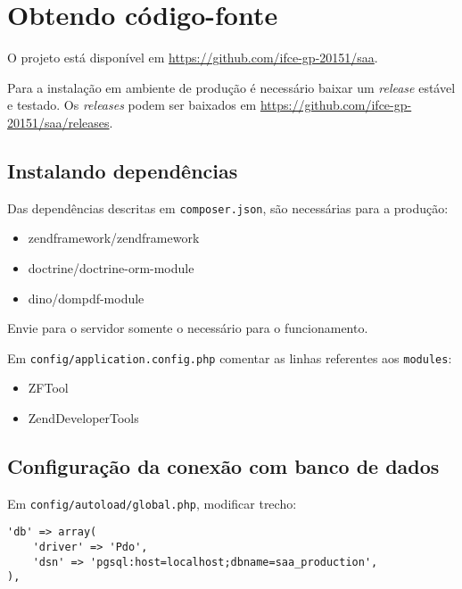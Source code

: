 \section{Obtendo código-fonte}\label{obtendo-cuxf3digo-fonte}

O projeto está disponível em \url{https://github.com/ifce-gp-20151/saa}.

Para a instalação em ambiente de produção é necessário baixar um
\emph{release} estável e testado. Os \emph{releases} podem ser baixados
em \url{https://github.com/ifce-gp-20151/saa/releases}.

\subsection{Instalando dependências}\label{instalando-dependuxeancias}

Das dependências descritas em \texttt{composer.json}, são necessárias
para a produção:

\begin{itemize}
\itemsep1pt\parskip0pt
\item
  zendframework/zendframework
\item
  doctrine/doctrine-orm-module
\item
  dino/dompdf-module
\end{itemize}

Envie para o servidor somente o necessário para o funcionamento.

Em \texttt{config/application.config.php} comentar as linhas referentes
aos \texttt{modules}:

\begin{itemize}
\itemsep1pt\parskip0pt
\item
  ZFTool
\item
  ZendDeveloperTools
\end{itemize}

\subsection{Configuração da conexão com banco de
dados}\label{configurauxe7uxe3o-da-conexuxe3o-com-banco-de-dados}

Em \texttt{config/autoload/global.php}, modificar trecho:

\begin{verbatim}
'db' => array(
    'driver' => 'Pdo',
    'dsn' => 'pgsql:host=localhost;dbname=saa_production',
),
\end{verbatim}

